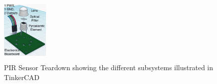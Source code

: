 
\begin{figure}   
        \centering
        \includegraphics[width=0.2\textwidth, height=1.3in]{figures/platform/3d_view_5-annotated.jpg}
        \caption{PIR Sensor Teardown showing the different subsystems illustrated in TinkerCAD}
        \label{fig:pir_system_teardown}
\end{figure}

